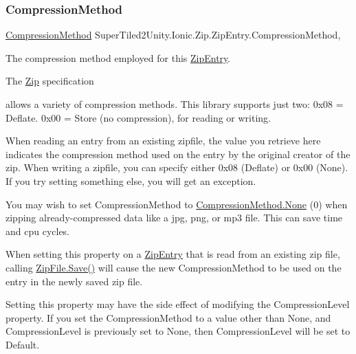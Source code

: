 \subsubsection{\texorpdfstring{Compression\+Method}{CompressionMethod}}
{\footnotesize\ttfamily \mbox{\hyperlink{namespace_super_tiled2_unity_1_1_ionic_1_1_zip_a48fd7a4529dd87fb2fda54f62ae3d8a3}{Compression\+Method}} Super\+Tiled2\+Unity.\+Ionic.\+Zip.\+Zip\+Entry.\+Compression\+Method\hspace{0.3cm}{\ttfamily [get]}, {\ttfamily [set]}}



The compression method employed for this \mbox{\hyperlink{class_super_tiled2_unity_1_1_ionic_1_1_zip_1_1_zip_entry}{Zip\+Entry}}. 

The \mbox{\hyperlink{namespace_super_tiled2_unity_1_1_ionic_1_1_zip}{Zip}} specification

allows a variety of compression methods. This library supports just two\+: 0x08 = Deflate. 0x00 = Store (no compression), for reading or writing. 

When reading an entry from an existing zipfile, the value you retrieve here indicates the compression method used on the entry by the original creator of the zip. When writing a zipfile, you can specify either 0x08 (Deflate) or 0x00 (None). If you try setting something else, you will get an exception. 

You may wish to set {\ttfamily Compression\+Method} to {\ttfamily \mbox{\hyperlink{namespace_super_tiled2_unity_1_1_ionic_1_1_zip_a48fd7a4529dd87fb2fda54f62ae3d8a3a6adf97f83acf6453d4a6a4b1070f3754}{Compression\+Method.\+None}}} (0) when zipping already-\/compressed data like a jpg, png, or mp3 file. This can save time and cpu cycles. 

When setting this property on a {\ttfamily \mbox{\hyperlink{class_super_tiled2_unity_1_1_ionic_1_1_zip_1_1_zip_entry}{Zip\+Entry}}} that is read from an existing zip file, calling {\ttfamily \mbox{\hyperlink{class_super_tiled2_unity_1_1_ionic_1_1_zip_1_1_zip_file_aff8f1b3d07b66481e2629b04017a056f}{Zip\+File.\+Save()}}} will cause the new Compression\+Method to be used on the entry in the newly saved zip file. 

Setting this property may have the side effect of modifying the {\ttfamily Compression\+Level} property. If you set the {\ttfamily Compression\+Method} to a value other than {\ttfamily None}, and {\ttfamily Compression\+Level} is previously set to {\ttfamily None}, then {\ttfamily Compression\+Level} will be set to {\ttfamily Default}. 

